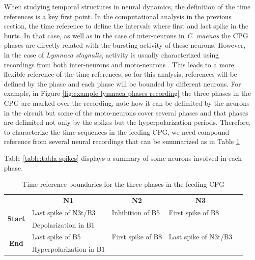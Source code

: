 When studying temporal structures in neural dynamics, the definition of the time references is a key first point. In the computational analysis in the previous section, the time reference to define the intervals where first and last spike in the burts. In that case, as well as in the case of inter-neurons in \textit{C. maenas} the CPG phases are directly related with the bursting activity of these neurons. However, in the case of \textit{Lymnaea stagnalis}, activity is usually characterized using recordings from both inter-neurons and moto-neurons \parencite{elliot, benjamin, crossley}. This leads to a more flexible reference of the time references, so for this analysis, references will be defined by the phase and each phase will be bounded by different neurons. For example, in Figure \ref{fig:example lymnaea phases recording} the three phases in the  CPG are marked over the recording, note how it can be delimited by the neurons in the circuit but some of the moto-neurons cover several phases and that phases are delimited not only by the spikes but the hyperpolarization periods. Therefore, to characterize the time sequences in the feeding CPG, we need compound reference from several neural recordings that can be summarized as in Table \ref{table:cpg ref intervals}

Table \ref{table:tabla spikes} displays a summary of some neurons involved in each phase. 

\begin{table}[htb!]
	\begin{tabular}{cl|l|ll}
		\multicolumn{1}{l}{}                                 & \multicolumn{1}{c|}{\textbf{N1}} & \multicolumn{1}{c|}{\textbf{N2}} & \multicolumn{1}{c}{\textbf{N3}} &  \\
		\multicolumn{1}{c|}{\multirow{2}{*}{\textbf{Start}}} & Last spike of N3t/B3             & Inhibition of B5                 & First spike of B8               &  \\
		\multicolumn{1}{c|}{}                                & Depolarization in B1             &                                  &                                 &  \\ \cline{1-4}
		\multicolumn{1}{c|}{\multirow{2}{*}{\textbf{End}}}   & Last spike of B5                 & First spike of B8                & Last spike of N3t/B3            &  \\
		\multicolumn{1}{c|}{}                                & Hyperpolarization in B1          &                                  &                                 & 
	\end{tabular}
	\caption{Time reference boundaries for the three phases in the feeding CPG}
	\label{table:cpg ref intervals}
\end{table}


